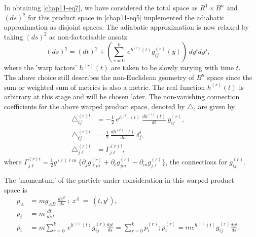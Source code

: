 In obtaining \eqref{chap11-eq7}, we have considered the total space as $R^1\times B^n$ and $(ds)^2$ for this product space in \eqref{chap11-eq5} implemented the adiabatic approximation as disjoint spaces. The adiabatic approximation is now relaxed by taking  $(ds)^2$ as non-factorisable ansatz 
\setcounter{equation}{8}
\begin{equation}
(ds)^2= (dt)^2+\left(\sum_{r=0}^k\ e^{h^{(r)}(t)}g_{ij}^{(r)}(y)\right)\ dy^idy^j,\label{chap11-eq9}
\end{equation}
where the 'warp factors' $h^{(r)}(t)$ are taken to be slowly varying with time $t$. The above choice still describes the  non-Euclidean geometry of $B^n$ space since the sum or weighted sum of metrics is also a metric. The real function $h^{(r)}(t)$  is arbitrary at this stage and will be chosen later. The non-vanishing connection coefficients for the above warped product  space, denoted by $\bigtriangleup$, are given by 
\begin{align}
{\bigtriangleup}^{(r) t}_{ij}&= -\frac{1}{2}\ e^{h^{(r)}(t)}\ \frac{dh^{(r)}(t)}{dt}\ g_{ij}^{(r)}, \nonumber \\
{\bigtriangleup}^{(r) i}_{tj}&= \frac{1}{2}\ \frac{dh^{(r)}(t)}{dt}\ {\delta}^i_j, \nonumber \\
{\bigtriangleup}^{(r) i}_{j\ell}&= {\Gamma}^{(r) i}_{j\ell},\label{chap11-eq10}
\end{align}
where ${\Gamma}^{(r) i}_{j\ell}=\frac{1}{2}g^{(r)\ell m}\ \{{\partial}_jg^{(r)}_{\ell m}+{\partial}_{\ell}g^{(r)}_{jm} 
-{\partial}_mg^{(r)}_{j\ell}\}$, the connections for $g_{ij}^{(r)}$. 

The 'momentum' of the particle under consideration in this warped product space is 
\begin{align}
p_A &= mg_{AB}\ \frac{dz^B}{ds}\ ;\ z^A\ =\ (t,y^i), \nonumber \\
p_t &= m\ \frac{dt}{ds}, \nonumber \\
p_i &= m\sum_{r=0}^k\ e^{h^{(r)}(t)}g_{ij}^{(r)}\frac{dy^j}{ds}=\sum_{r=0}^k p_i^{(r)}; p_i^{(r)}=me^{h^{(r)}(t)}
g_{ij}^{(r)}\frac{dy^j}{ds}.\label{chap11-eq11}
\end{align}

